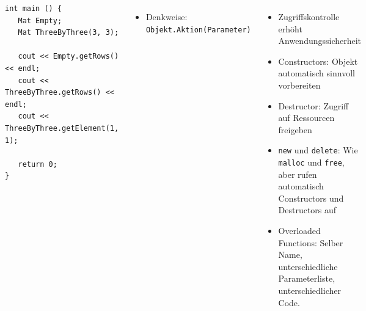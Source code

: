 \begin{frame}[fragile]
%
\begin{columns}[T]
%
\begin{codebox}[... Fortsetzung]
\begin{verbatim}
int main () {
   Mat Empty;
   Mat ThreeByThree(3, 3);

   cout << Empty.getRows() << endl;
   cout << ThreeByThree.getRows() << endl;
   cout << ThreeByThree.getElement(1, 1);

   return 0;
}
\end{verbatim}
\end{codebox}
%
\begin{itemize}
\item Denkweise: \texttt{Objekt.Aktion(Parameter)}
\end{itemize}
%	
\begin{itemize}
\item Zugriffskontrolle erhöht Anwendungssicherheit
\item Constructors: Objekt automatisch sinnvoll vorbereiten
\item Destructor: Zugriff auf Ressourcen freigeben
\item \texttt{new} und \texttt{delete}: Wie \texttt{malloc} und 
	\texttt{free}, aber rufen automatisch Constructors und Destructors auf
\item Overloaded Functions: Selber Name, unterschiedliche Parameterliste, unterschiedlicher Code.
\end{itemize}
\end{columns}
%
\end{frame}


